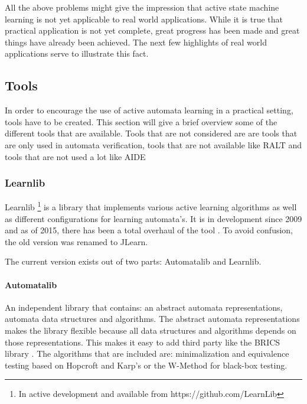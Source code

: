 \documentclass[multi,crop=false,class=article]{standalone}
\begin{document}

All the above problems might give the impression that active state machine
learning is not yet applicable to real world applications. While it is true that
practical application is not yet complete, great progress has been made and
great things have already been achieved. The next few highlights of real world
applications serve to illustrate this fact.

\subsection{Tools}
\label{ssec:tools}

In order to encourage the use of active automata learning in a practical
setting, tools have to be created. This section will give a brief overview some
of the different tools that are available. Tools that are not considered are
are tools that are only used in automata verification, tools that are not
available like RALT \cite{Shahbaz:2014:ATB:2858086.2858089} and tools that are
not used a lot like AIDE \cite{Cicala2016}

\subsubsection{Learnlib}
\label{sssec:learnlib}

Learnlib  \footnote{In active development and available from
https://github.com/LearnLib } is a library that implements various active
learning algorithms as well as different configurations for learning
automata's. It is in development since 2009 \cite{Raffelt2009} and as of 2015,
there has been a
total overhaul of the tool \cite{Isberner2015}. To avoid confusion, the old
version was renamed
to JLearn.

The current version exists out of two parts: Automatalib and Learnlib.


\paragraph{Automatalib} An independent library that contains: an abstract
automata representations, automata data structures and algorithms. The abstract
automata representations makes the library flexible because all data structures
and algorithms depends on those representations. This makes it easy to add
third party like the BRICS library \cite{Alur:2005:SIS:1047659.1040314}. The
algorithms that are included are: minimalization and equivalence testing based
on Hopcroft and Karp's \cite{hopcroft1971linear} or the W-Method for black-box
testing.
\end{document}

